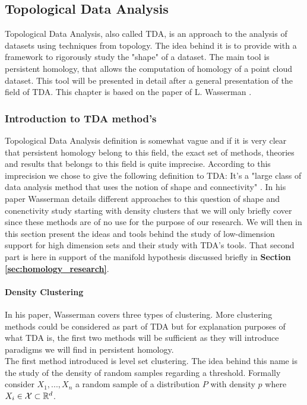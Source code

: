 \documentclass[12pt, a4paper]{article}
\begin{document}
\subsection{Topological Data Analysis}

Topological Data Analysis, also called TDA, is an approach to the analysis of datasets using techniques from topology. The idea behind it is to provide with a framework to rigorously study the "shape" of a dataset. The main tool is persistent homology, that allows the computation of homology of a point cloud dataset. This tool will be presented in detail after a general presentation of the field of TDA. This chapter is based on the paper of L. Wasserman \cite{wasserman_topological_2016}. 

\subsubsection{Introduction to TDA method's}

Topological Data Analysis definition is somewhat vague and if it is very clear that persistent homology belong to this field, the exact set of methods, theories and results that belongs to this field is quite imprecise. According to this imprecision we chose to give the following definition to TDA: It's a "large class of data analysis method that uses the notion of shape and connectivity" \cite{wasserman_topological_2016}. In his paper Wasserman details different approaches to this question of shape and conenctivity study starting with density clusters that we will only briefly cover since these methods are of no use for the purpose of our research. We will then in this section present the ideas and tools behind the study of low-dimension support for high dimension sets and their study with TDA's tools. That second part is here in support of the manifold hypothesis discussed briefly in \textbf{Section \ref{sec:homology_research}}.

\paragraph{Density Clustering}

In his paper, Wasserman covers three types of clustering. More clustering methods could be considered as part of TDA but for explanation purposes of what TDA is, the first two methods will be sufficient as they will introduce paradigms we will find in persistent homology.\\

The first method introduced is level set clustering. The idea behind this name is the study of the density of random samples regarding a threshold. Formally consider $X_1, ..., X_n$ a random sample of a distribution $P$ with density $p$ where $X_i \in \mathcal{X} \subset \mathbb{R}^d$.\\
\end{document}

